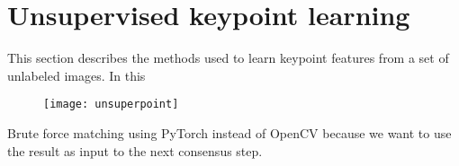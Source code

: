 \section{Unsupervised keypoint learning}

This section describes the methods used to learn keypoint features from a set of unlabeled images. In this 

\begin{figure}[H]
	\centering
	\texttt{[image: unsuperpoint]}
	\caption{}
	\label{fig:unsuperpoint}
\end{figure}

Brute force matching using PyTorch instead of OpenCV because we want to use the result as input to the next consensus step.